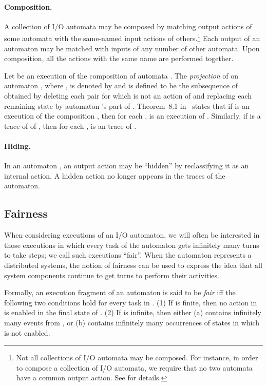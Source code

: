 \documentclass[11pt]{article}
\numberwithin{theorem}{section}
\begin{document}
\paragraph{Composition.} 
A collection of I/O automata may be composed by matching output
actions of some automata with the same-named input actions of
others.\footnote{Not all collections of I/O automata may be
  composed. For instance, in order to compose a collection of I/O
  automata, we require that no two automata have a common output
  action.  See \cite[chapter 8]{lync:da} for details.}
Each output of an automaton may be matched with inputs of any number
of other automata. 
Upon composition, all the actions with the same name are performed
together.

Let  be an execution of the
composition of automata . 
The \emph{projection} of  on automaton , where , is denoted by  and is defined to be the
subsequence of  obtained by deleting each pair 
for which  is not an action of  and replacing each remaining
state  by automaton 's part of . 
Theorem~8.1 in~\cite{lync:da} states that if  is an execution
of the composition , then for each ,
 is an execution of . 
Similarly, if  is a trace of of , then for
each ,  is an trace of .



\paragraph{Hiding.} 
In an automaton , an output action may be ``hidden'' by
reclassifying it as an internal action. 
A hidden action no longer appears in the traces of the automaton.

\subsection{Fairness}
\label{sec: IOA: fairness}

When considering executions of an I/O automaton, we will often be
interested in those executions in which every task of the automaton
gets infinitely many turns to take steps; we call such executions
``fair''.
When the automaton represents a distributed systems, the notion of
fairness can be used to express the idea that all system components
continue to get turns to perform their activities.

Formally, an execution fragment  of an automaton  is said
to be \emph{fair} iff the following two conditions hold for
every task  in . (1) If  is finite, then no action in
 is enabled in the final state of . (2) If  is
infinite, then either (a)  contains infinitely many events
from , or (b)  contains infinitely many occurrences of
states in which  is not enabled.
\end{document}
